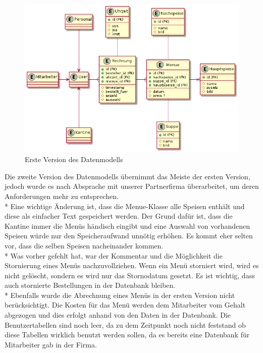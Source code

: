 \begin{figure}[htp]
    \centering
    \includegraphics[scale=0.6]{pics/erd-alt.png}
    \caption{Erste Version des Datenmodells}
    \label{fig:impl:ERDold}
\end{figure}

Die zweite Version des Datenmodells übernimmt das Meiste der ersten Version, jedoch wurde es nach Absprache mit unserer Partnerfirma überarbeitet, um deren Anforderungen mehr zu entsprechen.\\*
Eine wichtige Änderung ist, dass die Menue-Klasse alle Speisen enthält und diese als einfacher Text gespeichert werden. Der Grund dafür ist, dass die Kantine
immer die Menüs händisch eingibt und eine Auswahl von vorhandenen Speisen würde nur den Speicheraufwand unnötig erhöhen. Es kommt eher selten vor, dass die selben Speisen nacheinander kommen.\\*
Was vorher gefehlt hat, war der Kommentar und die Möglichkeit die Stornierung eines Menüs nachzuvollziehen. Wenn ein Menü storniert wird, wird es nicht gelöscht, sondern es wird nur 
das Stornodatum gesetzt. Es ist wichtig, dass auch stornierte Bestellungen in der Datenbank bleiben. \\*
Ebenfalls wurde die Abrechnung eines Menüs in der ersten Version nicht berücksichtigt. Die Kosten für das Menü werden dem Mitarbeiter vom Gehalt abgezogen und dies erfolgt anhand 
von den Daten in der Datenbank.
Die Benutzertabellen sind noch leer, da zu dem Zeitpunkt noch nicht feststand ob diese Tabellen wirklich benutzt werden sollen, da es bereits eine Datenbank für Mitarbeiter gab in der Firma.  \pagebreak

